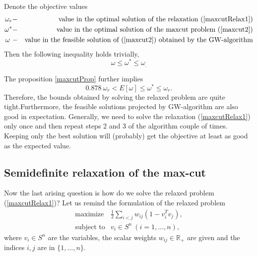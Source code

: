 \documentclass[12pt]{book}
\theoremstyle{definition}
\begin{document}
\rem Denote the objective values 
\begin{eqnarray*}
\omega_r &-& \mbox{value in the optimal solution of the relaxation (\ref{maxcutRelax1})} \\
\omega^* &-& \mbox{value in the optimal solution of the maxcut problem (\ref{maxcut2})} \\
\omega \  &-& \mbox{value in the feasible solution of (\ref{maxcut2}) obtained by the GW-algorithm} 
\end{eqnarray*}
Then the following inequality holds trivially, %
\begin{equation*}
\omega \leq \omega^*\leq \omega_.
\end{equation*}

The proposition \ref{maxcutProp} further implies  
\begin{equation*}
0.878 \ \omega_r < E[\omega] \leq \omega^*\leq \omega_r.
\end{equation*}
Therefore, the bounds obtained by solving the relaxed problem are quite tight.Furthermore, the feasible solutions projected by GW-algorithm are also good in expectation. Generally, we need to solve the relaxation (\ref{maxcutRelax1}) only once and then repeat steps 2 and 3 of the algorithm couple of times. 
Keeping only the best solution will (probably) get the objective at least as good as the expected value.


\subsection{Semidefinite relaxation of the max-cut}

Now the last arising question is how do we solve the relaxed problem (\ref{maxcutRelax1})? 
Let us remind the formulation of the relaxed problem
\begin{equation*}
\begin{array}{ll}
\mbox{maximize} & \frac{1}{2}\sum_{i<j}w_{ij}(1-v_i^Tv_j ), \\
\mbox{subject to} &  v_i \in S^n \ (i = 1,\dots ,n),
\end{array}
\end{equation*}
where $v_i\in S^n$ are the variables, the scalar weights $w_{ij}\in \mathbb{R}_+$ are given
and the indices $i,j$ are in $\{1,\dots ,n\}$.
\end{document}
